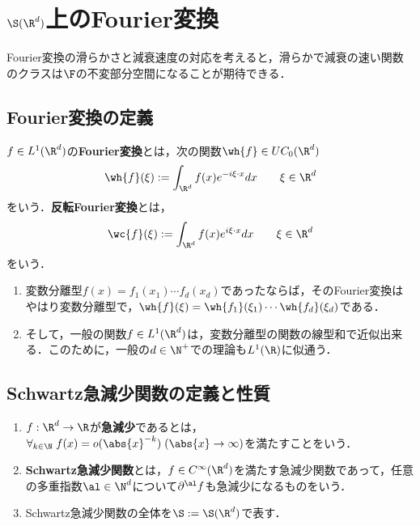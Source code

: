 \documentclass[uplatex,dvipdfmx]{jsreport}
\begin{document}
\section{$\S(\R^d)$上のFourier変換}

\begin{tcolorbox}[colframe=ForestGreen, colback=ForestGreen!10!white,breakable,colbacktitle=ForestGreen!40!white,coltitle=black,fonttitle=\bfseries\sffamily,
title=]
    Fourier変換の滑らかさと減衰速度の対応を考えると，滑らかで減衰の速い関数のクラスは$\F$の不変部分空間になることが期待できる．
\end{tcolorbox}

\subsection{Fourier変換の定義}

\begin{definition}
    $f\in L^1(\R^d)$の\textbf{Fourier変換}とは，次の関数$\wh{f}\in UC_0(\R^d)$
    \[\wh{f}(\xi):=\int_{\R^d}f(x)e^{-i\xi\cdot x}dx\qquad\xi\in\R^d\]
    をいう．\textbf{反転Fourier変換}とは，
    \[\wc{f}(\xi):=\int_{\R^d}f(x)e^{i\xi\cdot x}dx\qquad\xi\in\R^d\]
    をいう．
\end{definition}
\begin{remarks}\mbox{}
    \begin{enumerate}
        \item 変数分離型$f(x)=f_1(x_1)\cdots f_d(x_d)$であったならば，そのFourier変換はやはり変数分離型で，$\wh{f}(\xi)=\wh{f_1}(\xi_1)\cdots\wh{f_d}(\xi_d)$である．
        \item そして，一般の関数$f\in L^1(\R^d)$は，変数分離型の関数の線型和で近似出来る\cite{木田良才-Fourier}．このために，一般の$d\in\N^+$での理論も$L^1(\R)$に似通う．
    \end{enumerate}
\end{remarks}

\subsection{Schwartz急減少関数の定義と性質}

\begin{definition}\mbox{}
    \begin{enumerate}
        \item $f:\R^d\to\R$が\textbf{急減少}であるとは，$\forall_{k\in\N}\;f(x)=o(\abs{x}^{-k})\;(\abs{x}\to\infty)$を満たすことをいう．
        \item \textbf{Schwartz急減少関数}とは，$f\in C^\infty(\R^d)$を満たす急減少関数であって，任意の多重指数$\al\in\N^d$について$\partial^\al f$も急減少になるものをいう．
        \item Schwartz急減少関数の全体を$\S:=\S(\R^d)$で表す．
    \end{enumerate}
\end{definition}
\end{document}
